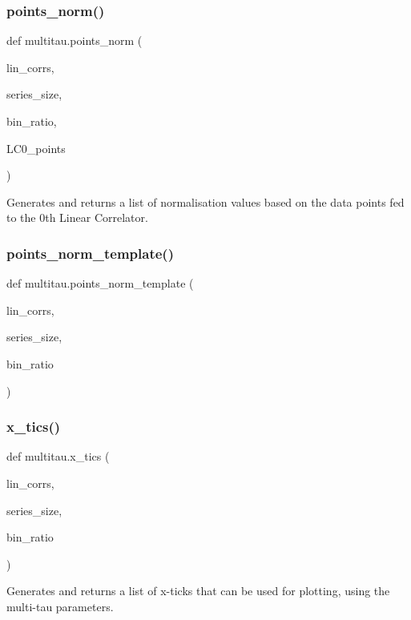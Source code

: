 \subsubsection{\texorpdfstring{points\+\_\+norm()}{points\_norm()}}
{\footnotesize\ttfamily def multitau.\+points\+\_\+norm (\begin{DoxyParamCaption}\item[{}]{lin\+\_\+corrs,  }\item[{}]{series\+\_\+size,  }\item[{}]{bin\+\_\+ratio,  }\item[{}]{L\+C0\+\_\+points }\end{DoxyParamCaption})}

\begin{DoxyVerb}Generates and returns a list of normalisation values based on the data points fed to 
the 0th Linear Correlator.
\end{DoxyVerb}
 \mbox{\label{namespacemultitau_a6a712a94c13f6c08874ea710fc698ff7}} 
\subsubsection{\texorpdfstring{points\+\_\+norm\+\_\+template()}{points\_norm\_template()}}
{\footnotesize\ttfamily def multitau.\+points\+\_\+norm\+\_\+template (\begin{DoxyParamCaption}\item[{}]{lin\+\_\+corrs,  }\item[{}]{series\+\_\+size,  }\item[{}]{bin\+\_\+ratio }\end{DoxyParamCaption})}

\mbox{\label{namespacemultitau_a775aea685fe55a6707400660fadf9c35}} 
\subsubsection{\texorpdfstring{x\+\_\+tics()}{x\_tics()}}
{\footnotesize\ttfamily def multitau.\+x\+\_\+tics (\begin{DoxyParamCaption}\item[{}]{lin\+\_\+corrs,  }\item[{}]{series\+\_\+size,  }\item[{}]{bin\+\_\+ratio }\end{DoxyParamCaption})}

\begin{DoxyVerb}Generates and returns a list of x-ticks that can be used for plotting, using the 
multi-tau parameters.
\end{DoxyVerb}
 